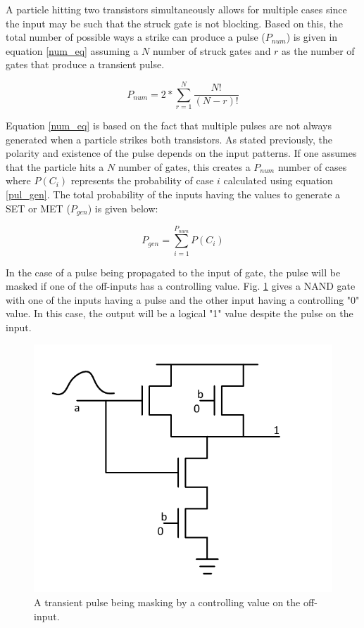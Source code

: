 A particle hitting two transistors simultaneously allows for multiple cases since the input may be such that the struck gate is not blocking. Based on this, the total number of possible ways a strike can produce a pulse ($P_{num}$) is given in equation \ref{num_eq} assuming a $N$ number of struck gates and $r$ as the number of gates that produce a transient pulse.

\begin{equation} \label{num_eq}
P_{num} = 2*\sum_{r=1}^{N} \frac{N!}{(N-r)!}
\end{equation}

Equation \ref{num_eq} is based on the fact that multiple pulses are not always generated when a particle strikes both transistors. As stated previously, the polarity and existence of the pulse depends on the input patterns. If one assumes that the particle hits a $N$ number of gates, this creates a $P_{num}$ number of cases where $P(C_i)$ represents the probability of case $i$ calculated using equation \ref{pul_gen}. The total probability of the inputs having the values to generate a SET or MET ($P_{gen}$) is given below:

\begin{equation} \label{err_eq}
P_{gen} = \sum_{i=1}^{P_{num}} P(C_i)
\end{equation}

In the case of a pulse being propagated to the input of gate, the pulse will be masked if one of the off-inputs has a controlling value. Fig. \ref{Prop_NAND} gives a NAND gate with one of the inputs having a pulse and the other input having a controlling "0" value. In this case, the output will be a logical "1" value despite the pulse on the input.

\begin{figure}[!htbp]
	\centering
	\includegraphics[width=0.55\linewidth]{Figures/Prop_func}
	\caption{A transient pulse being masking by a controlling value on the off-input.}
	\label{Prop_NAND}
\end{figure}

